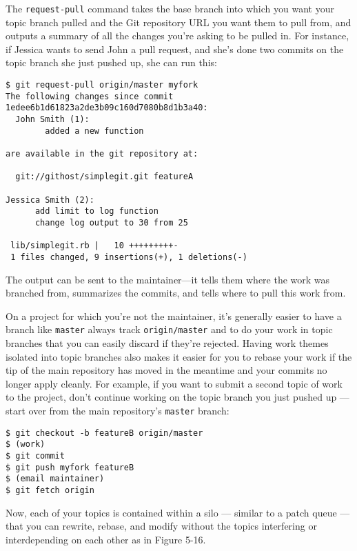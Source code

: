 \documentclass[a4paper]{book}
\begin{document}
The \texttt{request-pull} command takes the base branch into which you want your topic branch pulled and the Git repository URL you want them to pull from, and outputs a summary of all the changes you're asking to be pulled in. For instance, if Jessica wants to send John a pull request, and she's done two commits on the topic branch she just pushed up, she can run this:

\begin{shaded}\begin{verbatim}
$ git request-pull origin/master myfork
The following changes since commit 1edee6b1d61823a2de3b09c160d7080b8d1b3a40:
  John Smith (1):
        added a new function

are available in the git repository at:

  git://githost/simplegit.git featureA

Jessica Smith (2):
      add limit to log function
      change log output to 30 from 25

 lib/simplegit.rb |   10 +++++++++-
 1 files changed, 9 insertions(+), 1 deletions(-)
\end{verbatim}\end{shaded}

The output can be sent to the maintainer---it tells them where the work was branched from, summarizes the commits, and tells where to pull this work from.

On a project for which you're not the maintainer, it's generally easier to have a branch like \texttt{master} always track \texttt{origin/master} and to do your work in topic branches that you can easily discard if they're rejected. Having work themes isolated into topic branches also makes it easier for you to rebase your work if the tip of the main repository has moved in the meantime and your commits no longer apply cleanly. For example, if you want to submit a second topic of work to the project, don't continue working on the topic branch you just pushed up --- start over from the main repository's \texttt{master} branch:

\begin{shaded}\begin{verbatim}
$ git checkout -b featureB origin/master
$ (work)
$ git commit
$ git push myfork featureB
$ (email maintainer)
$ git fetch origin
\end{verbatim}\end{shaded}

Now, each of your topics is contained within a silo --- similar to a patch queue --- that you can rewrite, rebase, and modify without the topics interfering or interdepending on each other as in Figure 5-16.
\end{document}
